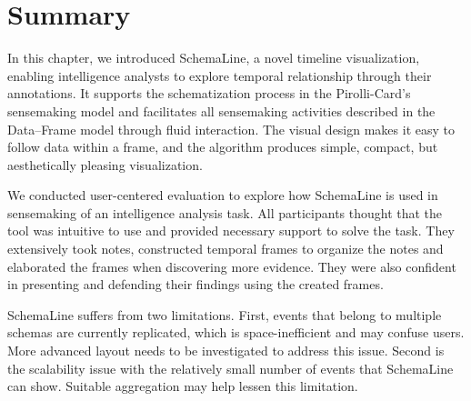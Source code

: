 \section{Summary}
In this chapter, we introduced SchemaLine, a novel timeline visualization, enabling intelligence analysts to explore temporal relationship through their annotations. It supports the schematization process in the Pirolli-Card's sensemaking model and facilitates all sensemaking activities described in the Data--Frame model through fluid interaction. The visual design makes it easy to follow data within a frame, and the algorithm produces simple, compact, but aesthetically pleasing visualization. 

We conducted user-centered evaluation to explore how SchemaLine is used in sensemaking of an intelligence analysis task. All participants thought that the tool was intuitive to use and provided necessary support to solve the task. They extensively took notes, constructed temporal frames to organize the notes and elaborated the frames when discovering more evidence. They were also confident in presenting and defending their findings using the created frames.

SchemaLine suffers from two limitations. First, events that belong to multiple schemas are currently replicated, which is space-inefficient and may confuse users. More advanced layout needs to be investigated to address this issue. Second is the scalability issue with the relatively small number of events that SchemaLine can show. Suitable aggregation may help lessen this limitation.